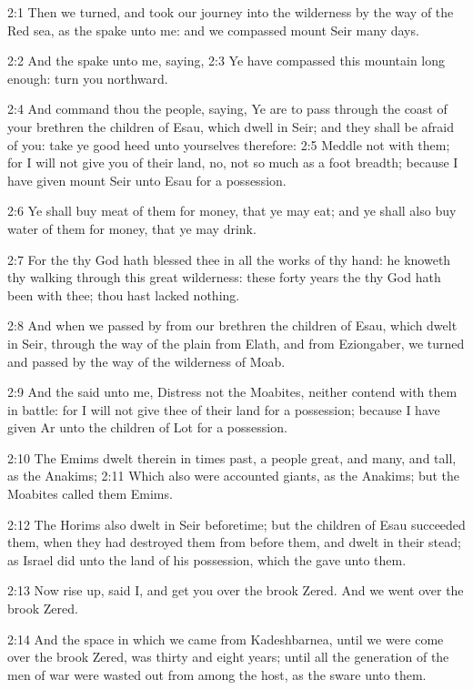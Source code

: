 2:1 Then we turned, and took our journey into the wilderness by the way of the Red sea, as the \LORD spake unto me: and we compassed mount Seir many days.

2:2 And the \LORD spake unto me, saying, 2:3 Ye have compassed this mountain long enough: turn you northward.

2:4 And command thou the people, saying, Ye are to pass through the coast of your brethren the children of Esau, which dwell in Seir; and they shall be afraid of you: take ye good heed unto yourselves therefore: 2:5 Meddle not with them; for I will not give you of their land, no, not so much as a foot breadth; because I have given mount Seir unto Esau for a possession.

2:6 Ye shall buy meat of them for money, that ye may eat; and ye shall also buy water of them for money, that ye may drink.

2:7 For the \LORD thy God hath blessed thee in all the works of thy hand: he knoweth thy walking through this great wilderness: these forty years the \LORD thy God hath been with thee; thou hast lacked nothing.

2:8 And when we passed by from our brethren the children of Esau, which dwelt in Seir, through the way of the plain from Elath, and from Eziongaber, we turned and passed by the way of the wilderness of Moab.

2:9 And the \LORD said unto me, Distress not the Moabites, neither contend with them in battle: for I will not give thee of their land for a possession; because I have given Ar unto the children of Lot for a possession.

2:10 The Emims dwelt therein in times past, a people great, and many, and tall, as the Anakims; 2:11 Which also were accounted giants, as the Anakims; but the Moabites called them Emims.

2:12 The Horims also dwelt in Seir beforetime; but the children of Esau succeeded them, when they had destroyed them from before them, and dwelt in their stead; as Israel did unto the land of his possession, which the \LORD gave unto them.

2:13 Now rise up, said I, and get you over the brook Zered. And we went over the brook Zered.

2:14 And the space in which we came from Kadeshbarnea, until we were come over the brook Zered, was thirty and eight years; until all the generation of the men of war were wasted out from among the host, as the \LORD sware unto them.

